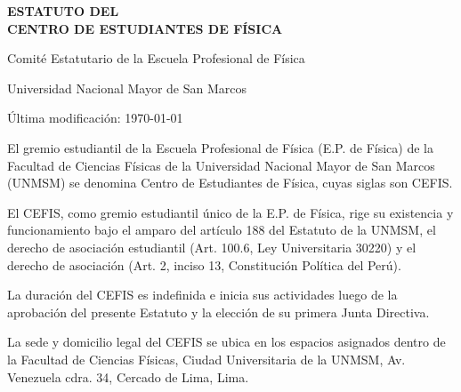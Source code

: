 \documentclass[11pt]{article}
\newcommand{\DocNom}{ESTATUTO DEL\\CENTRO DE ESTUDIANTES DE FÍSICA}
\newcommand{\DocFecha}{\today}
\newcommand{\DocAutor}{Comité Estatutario de la Escuela Profesional de Física}
\newcommand{\DocUniversidad}{Universidad Nacional Mayor de San Marcos}
\begin{document}
\begin{titlepage}
    \begin{center}
        \null%
        \vfill

        {\sffamily\bfseries\fontsize{16}{19}\selectfont \DocNom\par}

        \vspace{0.5cm}

        {\sffamily\Large \DocAutor\par}
        \vspace{0.25cm}
        {\sffamily\small \DocUniversidad\par}

        \vfill
        {\sffamily\normalsize Última modificación: \DocFecha\par}
    \end{center}
\end{titlepage}

\tableofcontents
\clearpage
{}



El gremio estudiantil de la Escuela Profesional de Física (E.P. de Física) de la Facultad de Ciencias Físicas de la Universidad Nacional Mayor de San Marcos (UNMSM) se denomina Centro de Estudiantes de Física, cuyas siglas son CEFIS.\@{}

El CEFIS, como gremio estudiantil único de la E.P. de Física, rige su existencia y funcionamiento bajo el amparo del artículo 188 del Estatuto de la UNMSM, el derecho de asociación estudiantil (Art. 100.6, Ley Universitaria 30220) y el derecho de asociación (Art. 2, inciso 13, Constitución Política del Perú).

La duración del CEFIS es indefinida e inicia sus actividades luego de la aprobación del presente Estatuto y la elección de su primera Junta Directiva.

La sede y domicilio legal del CEFIS se ubica en los espacios asignados dentro de la Facultad de Ciencias Físicas, Ciudad Universitaria de la UNMSM, Av. Venezuela cdra. 34, Cercado de Lima, Lima.
\end{document}
